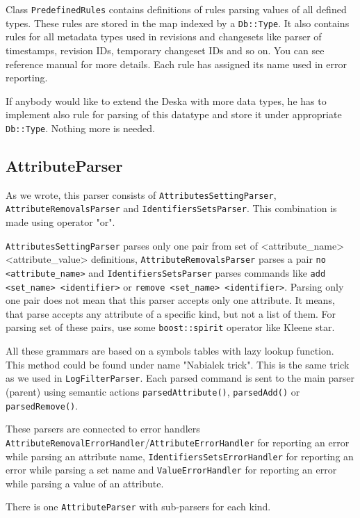 \documentclass[deska]{subfiles}
\begin{document}
Class {\tt PredefinedRules} contains definitions of rules parsing values of all defined types. These rules are stored
in the map indexed by a {\tt Db::Type}. It also contains rules for all metadata types used in revisions and changesets
like parser of timestamps, revision IDs, temporary changeset IDs and so on. You can see reference manual for more details.
Each rule has assigned its name used in error reporting.

If anybody would like to extend the Deska with more data types, he has to implement also rule for parsing of this datatype
and store it under appropriate {\tt Db::Type}. Nothing more is needed.

\subsection{AttributeParser}

As we wrote, this parser consists of {\tt AttributesSettingParser}, {\tt AttributeRemovalsParser} and {\tt IdentifiersSetsParser}.
This combination is made using operator "or".

{\tt AttributesSettingParser} parses only one pair from set of <attribute\_name> <attribute\_value> definitions, {\tt AttributeRemovalsParser}
parses a pair {\tt no <attribute\_name>} and {\tt IdentifiersSetsParser} parses commands like {\tt add <set\_name> <identifier>} or
{\tt remove <set\_name> <identifier>}. Parsing only one pair does not mean that this parser accepts only
one attribute. It means, that parse accepts any attribute of a specific kind, but not a list of them.
For parsing set of these pairs, use some {\tt boost::spirit} operator like Kleene star.

All these grammars are based on a symbols tables with lazy lookup function. This method could be found
under name "Nabialek trick". This is the same trick as we used in {\tt LogFilterParser}. Each parsed command is sent to the
main parser (parent) using semantic actions {\tt parsedAttribute()}, {\tt parsedAdd()} or {\tt parsedRemove()}.

These parsers are connected to error handlers {\tt AttributeRemovalErrorHandler}/{\tt AttributeErrorHandler} for reporting an error
while parsing an attribute name, {\tt IdentifiersSetsErrorHandler} for reporting an error while parsing a set name and
{\tt ValueErrorHandler} for reporting an error while parsing a value of an attribute.

There is one {\tt AttributeParser} with sub-parsers for each kind.
\end{document}
